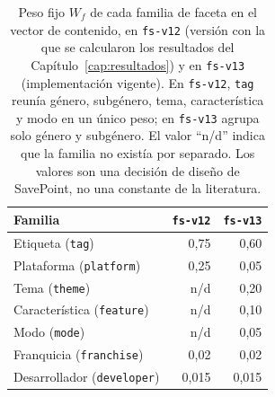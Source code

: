 \begin{table}[H]
\centering
\caption[Peso fijo de cada familia de faceta en el vector de contenido]{Peso fijo \(W_f\) de cada familia de faceta en el vector de contenido, en
\texttt{fs-v12} (versión con la que se calcularon los resultados del
Capítulo~\ref{cap:resultados}) y en \texttt{fs-v13} (implementación vigente). En
\texttt{fs-v12}, \texttt{tag} reunía género, subgénero, tema, característica y modo en un único
peso; en \texttt{fs-v13} agrupa solo género y subgénero. El valor \enquote{n/d} indica que la familia no
existía por separado. Los valores son una decisión de diseño de SavePoint, no una constante de
la literatura.}\label{tab:pesos-familia}
\begin{tabularx}{\textwidth}{@{}Yrr@{}}
\textnormal{Familia} & \textnormal{\texttt{fs-v12}} & \textnormal{\texttt{fs-v13}} \\
\hline
Etiqueta (\texttt{tag}) & 0,75 & 0,60 \\
Plataforma (\texttt{platform}) & 0,25 & 0,05 \\
Tema (\texttt{theme}) & n/d & 0,20 \\
Característica (\texttt{feature}) & n/d & 0,10 \\
Modo (\texttt{mode}) & n/d & 0,05 \\
Franquicia (\texttt{franchise}) & 0,02 & 0,02 \\
Desarrollador (\texttt{developer}) & 0,015 & 0,015 \\
\end{tabularx}
\end{table}

